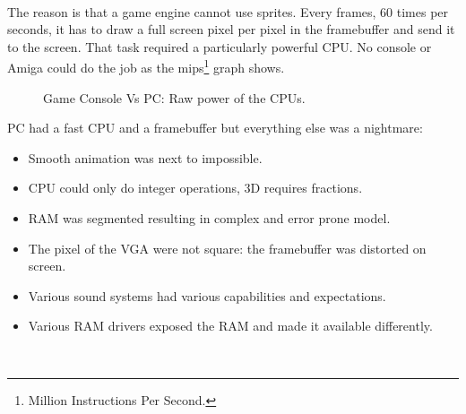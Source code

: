 \\
The reason is that a game engine cannot use sprites. Every frames, 60 times per seconds, it has to draw a full screen pixel per pixel in the framebuffer and send it to the screen. That task required a particularly powerful CPU. No console or Amiga could do the job as the mips\footnote{Million Instructions Per Second.} graph shows.
\\
\begin{figure}[H]
\centering
   \caption{Game Console Vs PC: Raw power of the CPUs.} \label{fig:game_console_vs_PC}
 \end{figure}
 
PC had a fast CPU and a framebuffer but everything else was a nightmare:
\begin{itemize}
\item Smooth animation was next to impossible.
\item CPU could only do integer operations, 3D requires fractions.
\item RAM was segmented resulting in complex and error prone model.
\item The pixel of the VGA were not square: the framebuffer was distorted on screen.
\item Various sound systems had various capabilities and expectations.
\item Various RAM drivers exposed the RAM and made it available differently.
\end{itemize}\\

